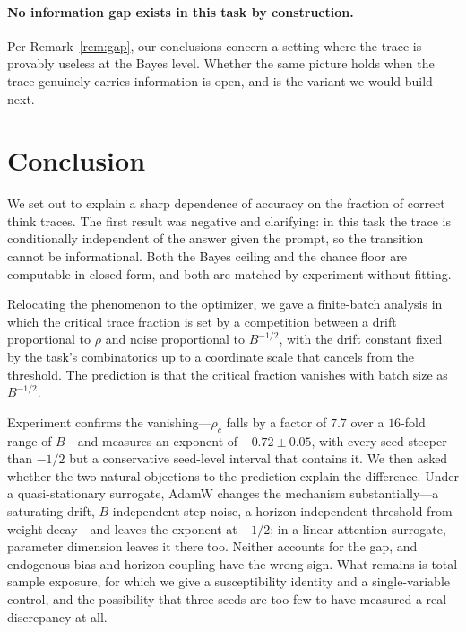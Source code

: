 \documentclass{article}
\theoremstyle{plain}
\theoremstyle{definition}
\theoremstyle{remark}
\newcommand{\1}{\mathbf{1}}
\begin{document}
\paragraph{No information gap exists in this task by construction.}
Per Remark~\ref{rem:gap}, our conclusions concern a setting where the trace is
provably useless at the Bayes level. Whether the same picture holds when the
trace genuinely carries information is open, and is the variant we would build
next.

\section{Conclusion}
\label{sec:conclusion}

We set out to explain a sharp dependence of accuracy on the fraction of correct
think traces. The first result was negative and clarifying: in this task the
trace is conditionally independent of the answer given the prompt, so the
transition cannot be informational. Both the Bayes ceiling and the chance floor
are computable in closed form, and both are matched by experiment without
fitting.

Relocating the phenomenon to the optimizer, we gave a finite-batch analysis in
which the critical trace fraction is set by a competition between a drift
proportional to $\rho$ and noise proportional to $B^{-1/2}$, with the drift
constant fixed by the task's combinatorics up to a coordinate scale that cancels
from the threshold. The prediction is that the critical fraction vanishes with
batch size as $B^{-1/2}$.

Experiment confirms the vanishing---$\rho_c$ falls by a factor of $7.7$ over a
$16$-fold range of $B$---and measures an exponent of $-0.72\pm0.05$, with every
seed steeper than $-1/2$ but a conservative seed-level interval that contains it.
We then asked whether the two natural objections to the prediction explain the
difference. Under a quasi-stationary surrogate, AdamW changes the mechanism
substantially---a saturating drift, $B$-independent step noise, a
horizon-independent threshold from weight decay---and leaves the exponent at
$-1/2$; in a linear-attention surrogate, parameter dimension leaves it there too.
Neither accounts for the gap, and endogenous bias and horizon coupling have the
wrong sign. What remains is total sample exposure, for which we give a
susceptibility identity and a single-variable control, and the possibility that
three seeds are too few to have measured a real discrepancy at all.
\end{document}
